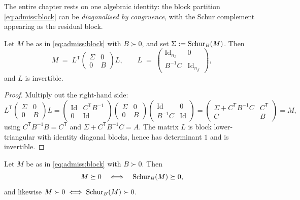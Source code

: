 The entire chapter rests on one algebraic identity: the block partition
\eqref{eq:admiss:block} can be \emph{diagonalised by congruence}, with the
Schur complement appearing as the residual block.

\begin{lemma}\label{lem:admiss:congruence}
Let $M$ be as in \eqref{eq:admiss:block} with $B \succ 0$, and set
$\Sigma := \mathrm{Schur}_{B}\!\left(M\right)$. Then
\begin{equation}\label{eq:admiss:ldl}
  M \;=\; L^{\mathsf T}
  \begin{pmatrix} \Sigma & 0 \\ 0 & B \end{pmatrix}
  L,
  \qquad
  L \;=\; \begin{pmatrix} \mathrm{Id}_{n_{\mathcal I}} & 0 \\
                          B^{-1} C & \mathrm{Id}_{n_{\mathcal J}}
          \end{pmatrix},
\end{equation}
and $L$ is invertible.
\end{lemma}

\begin{proof}
Multiply out the right-hand side:
\[
  L^{\mathsf T} \begin{pmatrix} \Sigma & 0 \\ 0 & B \end{pmatrix} L
  = \begin{pmatrix} \mathrm{Id} & C^{\mathsf T} B^{-1} \\ 0 & \mathrm{Id} \end{pmatrix}
    \begin{pmatrix} \Sigma & 0 \\ 0 & B \end{pmatrix}
    \begin{pmatrix} \mathrm{Id} & 0 \\ B^{-1} C & \mathrm{Id} \end{pmatrix}
  = \begin{pmatrix} \Sigma + C^{\mathsf T} B^{-1} C & C^{\mathsf T} \\
                    C & B \end{pmatrix}
  = M,
\]
using $C^{\mathsf T} B^{-1} B = C^{\mathsf T}$ and
$\Sigma + C^{\mathsf T} B^{-1} C = A$. The matrix $L$ is block
lower-triangular with identity diagonal blocks, hence has determinant $1$
and is invertible.
\end{proof}

\begin{theorem}\label{thm:admiss:criterion}
Let $M$ be as in \eqref{eq:admiss:block} with $B \succ 0$. Then
\[
  M \succeq 0
  \quad\Longleftrightarrow\quad
  \mathrm{Schur}_{B}\!\left(M\right) \succeq 0,
\]
and likewise $M \succ 0 \iff \mathrm{Schur}_{B}\!\left(M\right) \succ 0$.
\end{theorem}

